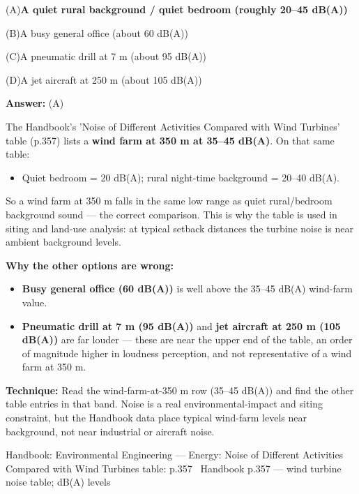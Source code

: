 \documentclass[11pt]{article}
\newcommand{\correct}[1]{\textbf{#1}\;{\color{accent}$\checkmark$}}
\newcommand{\optline}[2]{\par\noindent\hspace{1.2em}(#1)\hspace{0.6em}#2}
\begin{document}
\optline{A}{\correct{A quiet rural background / quiet bedroom (roughly 20--45 dB(A))}}
\optline{B}{A busy general office (about 60 dB(A))}
\optline{C}{A pneumatic drill at 7 m (about 95 dB(A))}
\optline{D}{A jet aircraft at 250 m (about 105 dB(A))}
\par\vspace{3pt}
\vspace{2pt}\par\noindent\colorbox{boxbg}{\parbox{\dimexpr\linewidth-2\fboxsep\relax}{%
\vspace{2pt}\textbf{Answer:} (A)\par\vspace{2pt}
{\small The Handbook's 'Noise of Different Activities Compared with Wind Turbines' table (p.357) lists a \textbf{wind farm at 350 m at 35--45 dB(A)}. On that same table:\par
\begin{itemize}\setlength{\itemsep}{0pt}\setlength{\parskip}{0pt}
\item Quiet bedroom = 20 dB(A); rural night-time background = 20--40 dB(A).
\end{itemize}
So a wind farm at 350 m falls in the same low range as quiet rural/bedroom background sound --- the correct comparison. This is why the table is used in siting and land-use analysis: at typical setback distances the turbine noise is near ambient background levels.\par
\textbf{Why the other options are wrong:}\par
\begin{itemize}\setlength{\itemsep}{0pt}\setlength{\parskip}{0pt}
\item \textbf{Busy general office (60 dB(A))} is well above the 35--45 dB(A) wind-farm value.
\item \textbf{Pneumatic drill at 7 m (95 dB(A))} and \textbf{jet aircraft at 250 m (105 dB(A))} are far louder --- these are near the upper end of the table, an order of magnitude higher in loudness perception, and not representative of a wind farm at 350 m.
\end{itemize}
\textbf{Technique:} Read the wind-farm-at-350 m row (35--45 dB(A)) and find the other table entries in that band. Noise is a real environmental-impact and siting constraint, but the Handbook data place typical wind-farm levels near background, not near industrial or aircraft noise.\par}\par\vspace{2pt}
{\footnotesize\color{soft}Handbook: Environmental Engineering --- Energy: Noise of Different Activities Compared with Wind Turbines table: p.357 \textbullet\ Handbook p.357 --- wind turbine noise table; dB(A) levels}\vspace{2pt}
}}
\vspace{9pt}
\end{document}
